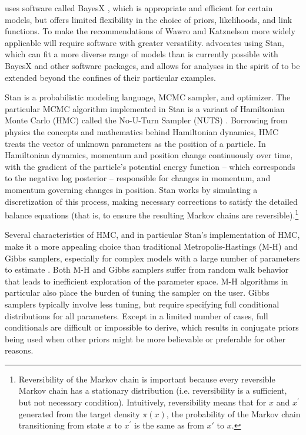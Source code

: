  uses software called BayesX , which 
is appropriate and  efficient for certain models, but offers limited flexibility in the choice of priors, 
likelihoods, and link functions. To make the recommendations of Wawro and Katznelson more widely 
applicable will require software with greater versatility.  advocates 
using Stan, which can fit a more diverse range of models than is currently possible with BayesX 
and other software packages, and allows for analyses in the spirit of  
to be extended beyond the confines of their particular examples.  

Stan is a probabilistic modeling language, MCMC sampler, and optimizer. The particular MCMC 
algorithm implemented in Stan is a variant of Hamiltonian Monte Carlo (HMC) called the No-U-Turn 
Sampler (NUTS) . Borrowing from physics the concepts and mathematics 
behind Hamiltonian dynamics, HMC treats the vector of unknown parameters as the position of a 
particle. In Hamiltonian dynamics, momentum and position change continuously over time, with the 
gradient of the particle's potential energy function --  which corresponds to the negative log posterior 
-- responsible for changes in momentum, and momentum governing changes in position. Stan works 
by simulating a discretization of this process, making necessary corrections to satisfy the detailed 
balance equations (that is, to ensure the resulting Markov chains are reversible).\footnote{Reversibility 
of the Markov chain is important because every reversible Markov chain has a stationary distribution 
(i.e. reversibility is a sufficient, but not necessary condition). Intuitively, reversibility means that for 
$x$ and $x^\prime$ generated from the target density $\pi(x)$, the probability of the Markov chain 
transitioning from state $x$ to $x^\prime$ is the same as from $x'$ to $x$.}  

Several characteristics of HMC, and in particular Stan's implementation of HMC, make it a more 
appealing choice than traditional Metropolis-Hastings (M-H) and Gibbs samplers, especially for 
complex models with a large number of parameters to estimate . Both M-H and Gibbs samplers suffer from random walk behavior 
that leads to inefficient exploration of the parameter space. M-H algorithms in particular also place the 
burden of tuning the sampler on the user. Gibbs samplers typically involve less tuning, but require 
specifying full conditional distributions for all parameters. Except in a limited number of cases, full 
conditionals are difficult or impossible to derive, which results in conjugate priors being used when 
other priors might be more believable or preferable for other reasons. 

